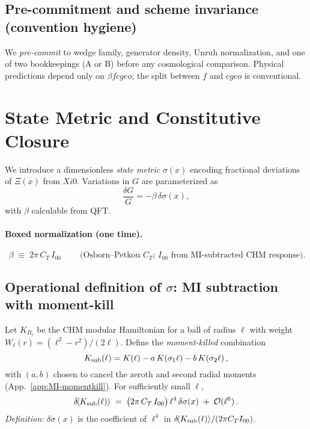 \documentclass[aps,prd,onecolumn,superscriptaddress,nofootinbib]{revtex4-2}
\def\cgeo{cgeo}%
\def\XiVac{Xi0}%
\def\boxed#1{#1}%
\newcommand{\cgeo}{c_{\rm geo}}
\newcommand{\XiVac}{\Xi_0}
\begin{document}
\subsection{Pre-commitment and scheme invariance (convention hygiene)}
\label{sec:precommit}
We \emph{pre-commit} to wedge family, generator density, Unruh normalization, and one of two bookkeepings (A or B) before any cosmological comparison. Physical predictions depend only on \(\beta f \cgeo\); the split between \(f\) and \(\cgeo\) is conventional.

\section{State Metric and Constitutive Closure}
\label{sec:state-metric}
We introduce a dimensionless \emph{state metric} \(\sigma(x)\) encoding fractional deviations of \(\Xi(x)\) from \(\XiVac\). Variations in \(G\) are parameterized as
\begin{equation}
\frac{\delta G}{G} = -\beta \, \delta\sigma(x),
\label{eq:beta-def}
\end{equation}
with \(\beta\) calculable from QFT.

\paragraph*{Boxed normalization (one time).}
\begin{equation}
\boxed{\ \beta \;\equiv\; 2\pi\, C_T\, I_{00}\ }\qquad
\text{(Osborn--Petkou \(C_T\); \(I_{00}\) from MI-subtracted CHM response).}
\label{eq:beta-box}
\end{equation}

\subsection{Operational definition of \(\sigma\): MI subtraction with moment-kill}
\label{sec:sigma-def}
Let \(K_{B_\ell}\) be the CHM modular Hamiltonian for a ball of radius \(\ell\) with weight \(W_\ell(r)=(\ell^2-r^2)/(2\ell)\). Define the \emph{moment-killed} combination
\begin{equation}
K_{\rm sub}(\ell)=K(\ell)-a\,K(\sigma_1\ell)-b\,K(\sigma_2\ell)\,,
\end{equation}
with \((a,b)\) chosen to cancel the zeroth and second radial moments (App.~\ref{app:MI-momentkill}). For sufficiently small \(\ell\),
\begin{equation}
\delta\!\langle K_{\rm sub}(\ell)\rangle \;=\; \big(2\pi\, C_T\, I_{00}\big)\, \ell^4\, \delta\sigma(x) \;+\; \mathcal O(\ell^6)\,.
\label{eq:sigma-operational}
\end{equation}
\emph{Definition:} \(\delta\sigma(x)\) is the coefficient of \(\ell^4\) in \(\delta\!\langle K_{\rm sub}(\ell)\rangle/(2\pi C_T I_{00})\).
\end{document}
